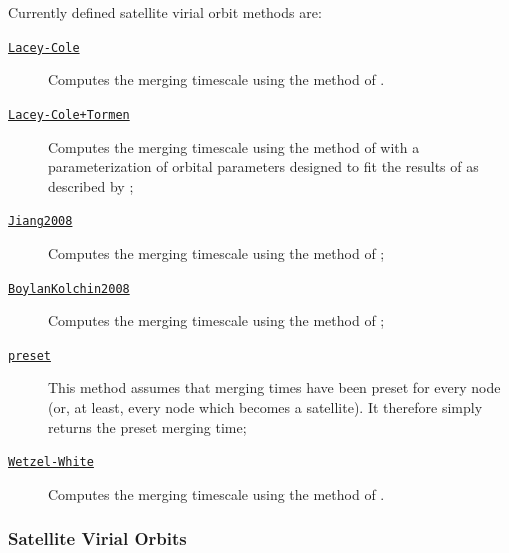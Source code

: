 Currently defined satellite virial orbit methods are:
\begin{description}
 \item [\hyperlink{satellites.merging.dynamical_friction.timescale.Lacey-Cole.F90:dynamical_friction_lacey_cole:satellite_time_until_merging_lacey_cole}{{\tt Lacey-Cole}}] Computes the merging timescale using the method of \cite{lacey_merger_1993}.
 \item [\hyperlink{satellites.merging.dynamical_friction.timescale.Lacey-Cole_Tormen.F90:dynamical_friction_lacey_cole_tormen:satellite_time_until_merging_lacey_cole_tormen}{{\tt Lacey-Cole+Tormen}}] Computes the merging timescale using the method of \cite{lacey_merger_1993} with a parameterization of orbital parameters designed to fit the results of \cite{tormen_rise_1997} as described by \cite{cole_hierarchical_2000};
 \item [\hyperlink{satellites.merging.dynamical_friction.timescale.Jiang2008.F90:dynamical_friction_jiang2008:satellite_time_until_merging_jiang2008}{{\tt Jiang2008}}] Computes the merging timescale using the method of \cite{jiang_fitting_2008};
 \item [\hyperlink{satellites.merging.dynamical_friction.timescale.Boylan-Kolchin2008.F90:dynamical_friction_boylankolchin2008:satellite_time_until_merging_boylankolchin2008}{{\tt BoylanKolchin2008}}] Computes the merging timescale using the method of \cite{boylan-kolchin_dynamical_2008};
 \item [\hyperlink{satellites.merging.preset.F90:satellite_merging_times_preset:satellite_time_until_merging_preset}{{\tt preset}}] This method assumes that merging times have been preset for every node (or, at least, every node which becomes a satellite). It therefore simply returns the preset merging time;
 \item [\hyperlink{satellites.merging.dynamical_friction.timescale.Wetzel-White.F90:dynamical_friction_wetzel_white:satellite_time_until_merging_wetzel_white}{{\tt Wetzel-White}}] Computes the merging timescale using the method of \cite{wetzel_what_2010}.
\end{description}

\subsubsection{Satellite Virial Orbits}\label{sec:SatelliteVirialOrbits}

